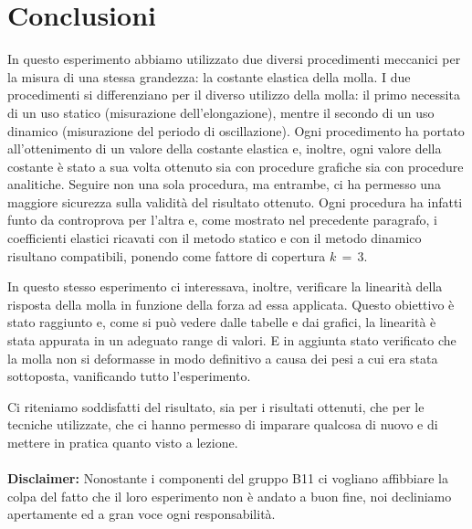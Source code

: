 \section{Conclusioni}

In questo esperimento abbiamo utilizzato due diversi procedimenti meccanici per la misura di una stessa grandezza: la costante elastica della molla. I due procedimenti si differenziano per il diverso utilizzo della molla: il primo necessita di un uso statico (misurazione dell'elongazione), mentre il secondo di un uso dinamico (misurazione del periodo di oscillazione). Ogni procedimento ha portato all'ottenimento di un valore della costante elastica e, inoltre, ogni valore della costante è stato a sua volta ottenuto sia con procedure grafiche sia con procedure analitiche.
Seguire non una sola procedura, ma entrambe, ci ha permesso una maggiore sicurezza sulla validità del risultato ottenuto. Ogni procedura ha infatti funto da controprova per l'altra e, come mostrato nel precedente paragrafo, i coefficienti elastici ricavati con il metodo statico e con il metodo dinamico risultano compatibili, ponendo come fattore di copertura $k\,=\,3$.

In questo stesso esperimento ci interessava, inoltre, verificare la linearità della risposta della molla in funzione della forza ad essa applicata. Questo obiettivo è stato raggiunto e, come si può vedere dalle tabelle e dai grafici, la linearità è stata appurata in un adeguato range di valori.
E in aggiunta stato verificato che la molla non si deformasse in modo definitivo a causa dei pesi a cui era stata sottoposta, vanificando tutto l'esperimento.

Ci riteniamo soddisfatti del risultato, sia per i risultati ottenuti, che per le tecniche utilizzate, che ci hanno permesso di imparare
qualcosa di nuovo e di mettere in pratica quanto visto a lezione.
\\
\\


\textbf{Disclaimer:} Nonostante i componenti del gruppo B11 ci vogliano affibbiare la colpa del fatto che il loro esperimento non è andato a buon fine, noi decliniamo apertamente ed a gran voce ogni responsabilità.
